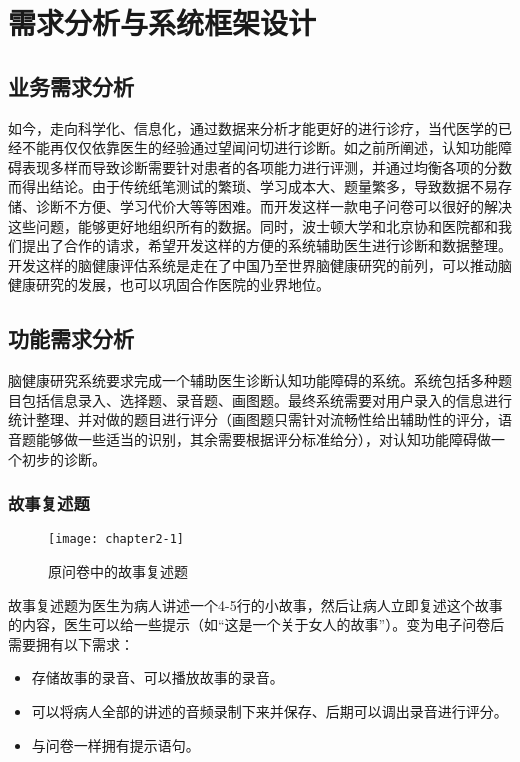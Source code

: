 

\chapter{需求分析与系统框架设计}

\section{业务需求分析}

如今，走向科学化、信息化，通过数据来分析才能更好的进行诊疗，当代医学的已经不能再仅仅依靠医生的经验通过望闻问切进行诊断。如之前所阐述，认知功能障碍表现多样而导致诊断需要针对患者的各项能力进行评测，并通过均衡各项的分数而得出结论。由于传统纸笔测试的繁琐、学习成本大、题量繁多，导致数据不易存储、诊断不方便、学习代价大等等困难。而开发这样一款电子问卷可以很好的解决这些问题，能够更好地组织所有的数据。同时，波士顿大学和北京协和医院都和我们提出了合作的请求，希望开发这样的方便的系统辅助医生进行诊断和数据整理。开发这样的脑健康评估系统是走在了中国乃至世界脑健康研究的前列，可以推动脑健康研究的发展，也可以巩固合作医院的业界地位。

\section{功能需求分析}

脑健康研究系统要求完成一个辅助医生诊断认知功能障碍的系统。系统包括多种题目包括信息录入、选择题、录音题、画图题。最终系统需要对用户录入的信息进行统计整理、并对做的题目进行评分（画图题只需针对流畅性给出辅助性的评分，语音题能够做一些适当的识别，其余需要根据评分标准给分），对认知功能障碍做一个初步的诊断。

\subsection{故事复述题}

\begin{figure}[h]
  \centering
  \texttt{[image: chapter2-1]}
  \caption{原问卷中的故事复述题}
\end{figure}

故事复述题为医生为病人讲述一个4-5行的小故事，然后让病人立即复述这个故事的内容，医生可以给一些提示（如“这是一个关于女人的故事”）。变为电子问卷后需要拥有以下需求：

\begin{itemize}
\item 存储故事的录音、可以播放故事的录音。
\item	可以将病人全部的讲述的音频录制下来并保存、后期可以调出录音进行评分。
\item 与问卷一样拥有提示语句。
\end{itemize}

